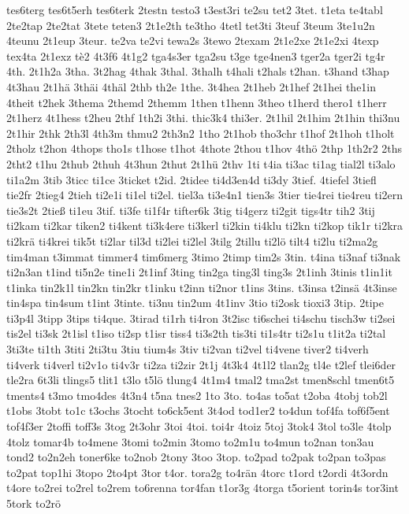 {tes6terg
tes6t5erh
tes6terk
2testn
testo3
t3est3ri
te2su
tet2
3tet.
t1eta
te4tabl
2te2tap
2te2tat
3tete
teten3
2t1e2th
te3tho
4tetl
tet3ti
3teuf
3teum
3te1u2n
4teunu
2t1eup
3teur.
te2va
te2vi
tewa2s
3tewo
2texam
2t1e2xe
2t1e2xi
4texp
tex4ta
2t1exz
tè2
4t3f6
4t1g2
tga4s3er
tga2su
t3ge
tge4nen3
tger2a
tger2i
tg4r
4th.
2t1h2a
3tha.
3t2hag
4thak
3thal.
3thalh
t4hali
t2hals
t2han.
t3hand
t3hap
4t3hau
2t1hä
3thäi
4thäl
2thb
th2e
1the.
3t4hea
2t1heb
2t1hef
2t1hei
the1in
4theit
t2hek
3thema
2themd
2themm
1then
t1henn
3theo
t1herd
thero1
t1herr
2t1herz
4t1hess
t2heu
2thf
1th2i
3thi.
thic3k4
thi3er.
2t1hil
2t1him
2t1hin
thi3nu
2t1hir
2thk
2th3l
4th3m
thmu2
2th3n2
1tho
2t1hob
tho3chr
t1hof
2t1hoh
t1holt
2tholz
t2hon
4thops
tho1s
t1hose
t1hot
4thote
2thou
t1hov
4thö
2thp
1th2r2
2ths
2tht2
t1hu
2thub
2thuh
4t3hun
2thut
2t1hü
2thv
1ti
t4ia
ti3ac
ti1ag
tial2l
ti3alo
ti1a2m
3tib
3ticc
ti1ce
3ticket
t2id.
2tidee
ti4d3en4d
ti3dy
3tief.
4tiefel
3tiefl
tie2fr
2tieg4
2tieh
ti2e1i
ti1el
ti2el.
tiel3a
ti3e4n1
tien3s
3tier
tie4rei
tie4reu
ti2ern
tie3s2t
2tieß
ti1eu
3tif.
ti3fe
ti1f4r
tifter6k
3tig
ti4gerz
ti2git
tigs4tr
tih2
3tij
ti2kam
ti2kar
tiken2
ti4kent
ti3k4ere
ti3kerl
ti2kin
ti4klu
ti2kn
ti2kop
tik1r
ti2kra
ti2krä
ti4krei
tik5t
ti2lar
til3d
ti2lei
ti2lel
3tilg
2tillu
ti2lö
tilt4
ti2lu
ti2ma2g
tim4man
t3immat
timmer4
tim6merg
3timo
2timp
tim2s
3tin.
t4ina
ti3naf
ti3nak
ti2n3an
t1ind
ti5n2e
tine1i
2t1inf
3ting
tin2ga
ting3l
ting3s
2t1inh
3tinis
t1in1it
t1inka
tin2k1l
tin2kn
tin2kr
t1inku
t2inn
ti2nor
t1ins
3tins.
t3insa
t2insä
4t3inse
tin4spa
tin4sum
t1int
3tinte.
ti3nu
tin2um
4t1inv
3tio
ti2osk
tioxi3
3tip.
2tipe
ti3p4l
3tipp
3tips
ti4que.
3tirad
ti1rh
ti4ron
3t2isc
ti6schei
ti4schu
tisch3w
ti2sei
tis2el
ti3sk
2t1isl
t1iso
ti2sp
t1isr
tiss4
ti3s2th
tis3ti
ti1s4tr
ti2s1u
t1it2a
ti2tal
3ti3te
ti1th
3titi
2ti3tu
3tiu
tium4s
3tiv
ti2van
ti2vel
ti4vene
tiver2
ti4verh
ti4verk
ti4verl
ti2v1o
ti4v3r
ti2za
ti2zir
2t1j
4t3k4
4t1l2
tlan2g
tl4e
t2lef
tlei6der
tle2ra
6t3li
tlings5
tlit1
t3lo
t5lö
tlung4
4t1m4
tmal2
tma2st
tmen8schl
tmen6t5
tments4
t3mo
tmo4des
4t3n4
t5na
tnes2
1to
3to.
to4as
to5at
t2oba
4tobj
tob2l
t1obs
3tobt
to1c
t3ochs
3tocht
to6ck5ent
3t4od
tod1er2
to4dun
tof4fa
tof6f5ent
tof4f3er
2toffi
toff3s
3tog
2t3ohr
3toi
4toi.
toi4r
4toiz
5toj
3tok4
3tol
to3le
4tolp
4tolz
tomar4b
to4mene
3tomi
to2min
3tomo
to2m1u
to4mun
to2nan
ton3au
tond2
to2n2eh
toner6ke
to2nob
2tony
3too
3top.
to2pad
to2pak
to2pan
to3pas
to2pat
top1hi
3topo
2to4pt
3tor
t4or.
tora2g
to4rän
4torc
t1ord
t2ordi
4t3ordn
t4ore
to2rei
to2rel
to2rem
to6renna
tor4fan
t1or3g
4torga
t5orient
torin4s
tor3int
5tork
to2rö
}
